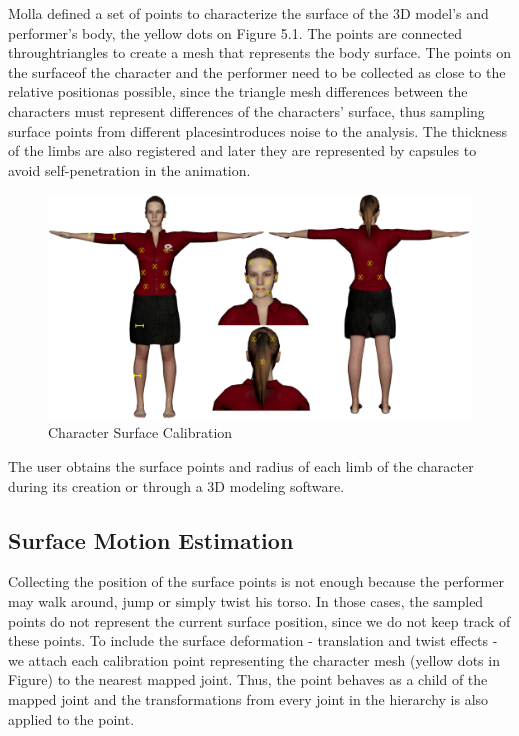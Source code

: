 \documentclass{vgtc}
\makeatletter
\def\maxwidth{\ifdim\Gin@nat@width>\linewidth\linewidth
    \else\Gin@nat@width\fi}
\let\Oldincludegraphics\includegraphics
\renewcommand{\includegraphics}[1]{\Oldincludegraphics[width=.8\maxwidth]{#1}}
\makeatother
\begin{document}
Molla defined a set of points to characterize the surface of the 3D
model's and performer's body, the yellow dots on Figure 5.1. The points
are connected throughtriangles to create a mesh that represents the body
surface. The points on the surfaceof the character and the performer
need to be collected as close to the relative positionas possible, since
the triangle mesh differences between the characters must represent
differences of the characters' surface, thus sampling surface points
from different placesintroduces noise to the analysis. The thickness of
the limbs are also registered and later they are represented by capsules
to avoid self-penetration in the animation.

\begin{figure}
\centering
\includegraphics{../figures/TalitaPoints.png}
\caption{Character Surface Calibration}
\end{figure}

The user obtains the surface points and radius of each limb of the
character during its creation or through a 3D modeling software.

    \hypertarget{surface-motion-estimation}{%
\subsection{Surface Motion Estimation}\label{surface-motion-estimation}}

Collecting the position of the surface points is not enough because the
performer may walk around, jump or simply twist his torso. In those
cases, the sampled points do not represent the current surface position,
since we do not keep track of these points. To include the surface
deformation - translation and twist effects - we attach each calibration
point representing the character mesh (yellow dots in Figure) to the
nearest mapped joint. Thus, the point behaves as a child of the mapped
joint and the transformations from every joint in the hierarchy is also
applied to the point.
\end{document}
